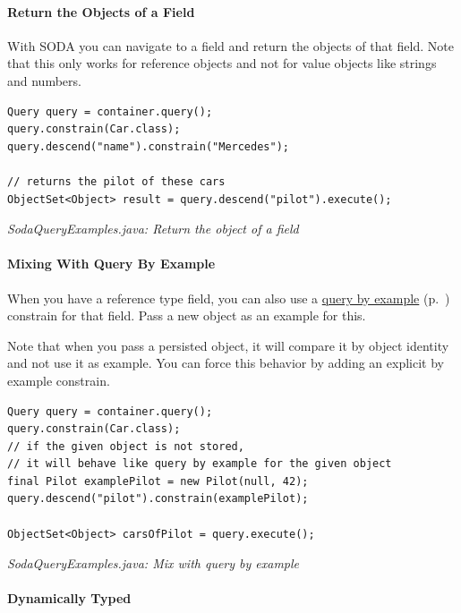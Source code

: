 \paragraph{Return the Objects of a Field}
\label{ref:basics-querying-soda-soda-special-case-examples:fieldobjects}

With SODA you can navigate to a field and return the objects of that field. Note that this only works for reference objects and not for value objects like strings and numbers.

\begin{lstlisting}
Query query = container.query();
query.constrain(Car.class);
query.descend("name").constrain("Mercedes");

// returns the pilot of these cars
ObjectSet<Object> result = query.descend("pilot").execute();
\end{lstlisting}

{\small\itshape SodaQueryExamples.java: Return the object of a field\par}
\medskip

\paragraph{Mixing With Query By Example}
\label{ref:basics-querying-soda-soda-special-case-examples:mixquerybyexample}

When you have a reference type field, you can also use a \hyperref[ref:basics-querying-query-by-example]{query by example} (p.~\pageref{ref:basics-querying-query-by-example}) constrain for that field. Pass a new object as an example for this.

Note that when you pass a persisted object, it will compare it by object identity and not use it as example. You can force this behavior by adding an explicit by example constrain.

\begin{lstlisting}
Query query = container.query();
query.constrain(Car.class);
// if the given object is not stored,
// it will behave like query by example for the given object
final Pilot examplePilot = new Pilot(null, 42);
query.descend("pilot").constrain(examplePilot);

ObjectSet<Object> carsOfPilot = query.execute();
\end{lstlisting}

{\small\itshape SodaQueryExamples.java: Mix with query by example\par}
\medskip

\paragraph{Dynamically Typed}
\label{ref:basics-querying-soda-soda-special-case-examples:dynamictypednature}

